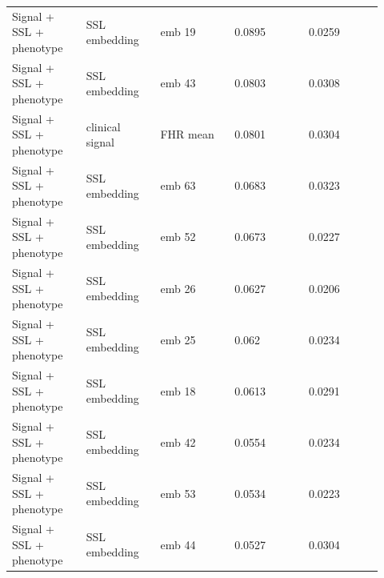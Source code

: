 \documentclass[utf8]{frontiers_suppmat}
\begin{document}
\begin{landscape}
\begin{longtable}{L{0.184\linewidth} L{0.184\linewidth} L{0.184\linewidth} L{0.184\linewidth} L{0.184\linewidth}}
Signal + SSL + phenotype & SSL embedding & emb 19 & 0.\allowbreak{}0895 & 0.\allowbreak{}0259 \\
Signal + SSL + phenotype & SSL embedding & emb 43 & 0.\allowbreak{}0803 & 0.\allowbreak{}0308 \\
Signal + SSL + phenotype & clinical signal & FHR mean & 0.\allowbreak{}0801 & 0.\allowbreak{}0304 \\
Signal + SSL + phenotype & SSL embedding & emb 63 & 0.\allowbreak{}0683 & 0.\allowbreak{}0323 \\
Signal + SSL + phenotype & SSL embedding & emb 52 & 0.\allowbreak{}0673 & 0.\allowbreak{}0227 \\
Signal + SSL + phenotype & SSL embedding & emb 26 & 0.\allowbreak{}0627 & 0.\allowbreak{}0206 \\
Signal + SSL + phenotype & SSL embedding & emb 25 & 0.\allowbreak{}062 & 0.\allowbreak{}0234 \\
Signal + SSL + phenotype & SSL embedding & emb 18 & 0.\allowbreak{}0613 & 0.\allowbreak{}0291 \\
Signal + SSL + phenotype & SSL embedding & emb 42 & 0.\allowbreak{}0554 & 0.\allowbreak{}0234 \\
Signal + SSL + phenotype & SSL embedding & emb 53 & 0.\allowbreak{}0534 & 0.\allowbreak{}0223 \\
Signal + SSL + phenotype & SSL embedding & emb 44 & 0.\allowbreak{}0527 & 0.\allowbreak{}0304 \\
\end{longtable}
\normalsize
\end{landscape}
\end{document}
